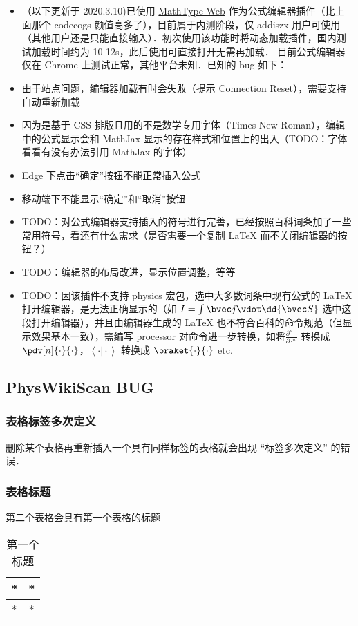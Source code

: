 \begin{itemize}
\item （以下更新于 2020.3.10)已使用 \href{http://www.wiris.net/client/editor/resources/help.html?v=7.9.0.6564}{MathType Web} 作为公式编辑器插件（比上面那个 codecogs 颜值高多了），目前属于内测阶段，仅 addiszx 用户可使用（其他用户还是只能直接输入）．初次使用该功能时将动态加载插件，国内测试加载时间约为 10-12s，此后使用可直接打开无需再加载．
目前公式编辑器仅在 Chrome 上测试正常，其他平台未知．已知的 bug 如下：
\item 由于站点问题，编辑器加载有时会失败（提示 Connection Reset），需要支持自动重新加载
\item 因为是基于 CSS 排版且用的不是数学专用字体（Times New Roman），编辑中的公式显示会和 MathJax 显示的存在样式和位置上的出入（TODO：字体看看有没有办法引用 MathJax 的字体）
\item Edge 下点击“确定”按钮不能正常插入公式
\item 移动端下不能显示“确定”和“取消”按钮
\item TODO：对公式编辑器支持插入的符号进行完善，已经按照百科词条加了一些常用符号，看还有什么需求（是否需要一个复制 LaTeX 而不关闭编辑器的按钮？）
\item TODO：编辑器的布局改进，显示位置调整，等等
\item TODO：因该插件不支持 physics 宏包，选中大多数词条中现有公式的 LaTeX 打开编辑器，是无法正确显示的（如 $I = \int \bvec j \vdot \dd{\bvec S}$ 选中这段打开编辑器），并且由编辑器生成的 LaTeX 也不符合百科的命令规范（但显示效果基本一致），需编写 processor 对命令进一步转换，如将$\frac{\partial^{n}{\cdot}}{\partial{\cdot}^{n}}$ 转换成 $\pdv[n]{\cdot}{\cdot}$，$\left\langle{\cdot}\vert{\cdot}\right\rangle$ 转换成 $\braket{\cdot}{\cdot}$ etc.

\end{itemize}

\subsection{PhysWikiScan BUG}

\subsubsection{表格标签多次定义}
删除某个表格再重新插入一个具有同样标签的表格就会出现 “标签多次定义” 的错误．

\subsubsection{表格标题}
第二个表格会具有第一个表格的标题
\begin{table}[ht]
\centering
\caption{第一个标题}\label{edTODO_tab2}
\begin{tabular}{|c|c|}
\hline
* & * \\
\hline
* & * \\
\hline
\end{tabular}
\end{table}

